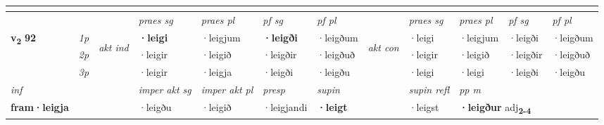 \begin{longtable}[l]{X>{\footnotesize\itshape}llXXXXlXXXX}
\midrule

  & \\
   \midrule
 & &   & \textit{praes sg}  & \textit{praes pl}    & \textit{ pf sg} & \textit{pf pl} & & \textit{praes sg}  & \textit{praes pl}    & \textit{pf sg} & \textit{pf pl }  \\ \cmidrule{4-7} \cmidrule{9-12}
 \multirow{2}{*}{{{\textbf{v{\textsubscript{2}}} \Large{\textbf{92}}}}}  & 1p & \multirow{3}{*}{\begin{turn}{90}\textit{akt ind}\end{turn}} & \textbf{·leigi} & ·leigjum & \textbf{·leigði} & ·leigðum & \multirow{3}{*}{\begin{turn}{90}\textit{akt con}\end{turn}} &·leigi & ·leigjum & ·leigði & ·leigðum\\*
 & 2p &  &  ·leigir  & ·leigið & ·leigðir & ·leigðuð & & ·leigir & ·leigið & ·leigðir & ·leigðuð \\*
 & 3p &  & ·leigir & ·leigja & ·leigði & ·leigðu & & ·leigi & ·leigi& ·leigði & ·leigðu \\*
\cmidrule{4-7} \cmidrule{9-12}

   {\textit{inf}} & &  & \textit{imper akt sg} & \textit{imper akt pl}   & \textit{presp} & \textit{supin} && \textit{supin refl} & \textit{pp m} \\*
  {\textbf{fram\allowbreak ·leigja}} & && ·leigðu  & ·leigið   & ·leigjandi &  \textbf{·leigt} && ·leigst & \multicolumn{2}{l}{\textbf{·leigður} adj\textbf{\textsubscript{2-4}}} \\*

\midrule


\end{longtable}
